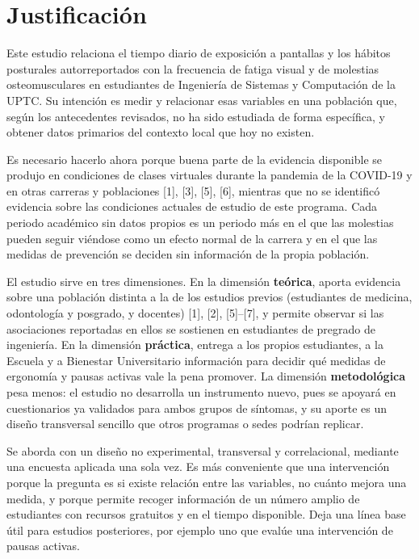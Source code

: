 
\section{Justificación}

Este estudio relaciona el tiempo diario de exposición a pantallas y los hábitos
posturales autorreportados con la frecuencia de fatiga visual y de molestias
osteomusculares en estudiantes de Ingeniería de Sistemas y Computación de la UPTC. Su
intención es medir y relacionar esas variables en una población que, según los
antecedentes revisados, no ha sido estudiada de forma específica, y obtener datos
primarios del contexto local que hoy no existen.

Es necesario hacerlo ahora porque buena parte de la evidencia disponible se produjo en
condiciones de clases virtuales durante la pandemia de la COVID-19 y en otras carreras
y poblaciones [1], [3], [5], [6], mientras que no se identificó evidencia sobre las
condiciones actuales de estudio de este programa. Cada periodo académico sin datos
propios es un periodo más en el que las molestias pueden seguir viéndose como un
efecto normal de la carrera y en el que las medidas de prevención se deciden sin
información de la propia población.

El estudio sirve en tres dimensiones. En la dimensión \textbf{teórica}, aporta
evidencia sobre una población distinta a la de los estudios previos (estudiantes de
medicina, odontología y posgrado, y docentes) [1], [2], [5]--[7], y permite observar
si las asociaciones reportadas en ellos se sostienen en estudiantes de pregrado de
ingeniería. En la dimensión \textbf{práctica}, entrega a los propios estudiantes, a la
Escuela y a Bienestar Universitario información para decidir qué medidas de ergonomía
y pausas activas vale la pena promover. La dimensión \textbf{metodológica} pesa menos:
el estudio no desarrolla un instrumento nuevo, pues se apoyará en cuestionarios ya
validados para ambos grupos de síntomas, y su aporte es un diseño transversal sencillo
que otros programas o sedes podrían replicar.

Se aborda con un diseño no experimental, transversal y correlacional, mediante una
encuesta aplicada una sola vez. Es más conveniente que una intervención porque la
pregunta es si existe relación entre las variables, no cuánto mejora una medida, y
porque permite recoger información de un número amplio de estudiantes con recursos
gratuitos y en el tiempo disponible. Deja una línea base útil para estudios
posteriores, por ejemplo uno que evalúe una intervención de pausas activas.
